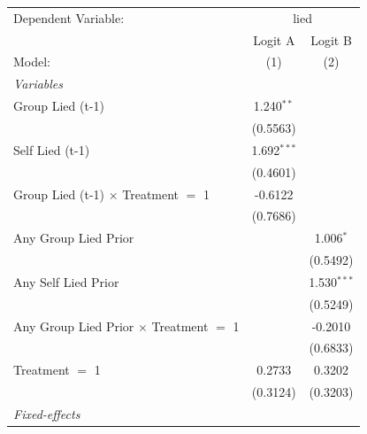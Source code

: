 
\begingroup
\centering
\begin{tabular}{lcc}
   \tabularnewline \midrule \midrule
   Dependent Variable: & \multicolumn{2}{c}{lied}\\
                                                                       & Logit A       & Logit B \\   
   Model:                                                              & (1)           & (2)\\  
   \midrule
   \emph{Variables}\\
   Group Lied (t-1)                                                    & 1.240$^{**}$  &   \\   
                                                                       & (0.5563)      &   \\   
   Self Lied (t-1)                                                     & 1.692$^{***}$ &   \\   
                                                                       & (0.4601)      &   \\   
   Group Lied (t-1) $\times$ Treatment $=$ 1                           & -0.6122       &   \\   
                                                                       & (0.7686)      &   \\   
   Any Group Lied Prior                                                &               & 1.006$^{*}$\\   
                                                                       &               & (0.5492)\\   
   Any Self Lied Prior                                                 &               & 1.530$^{***}$\\   
                                                                       &               & (0.5249)\\   
   Any Group Lied Prior $\times$ Treatment $=$ 1                       &               & -0.2010\\   
                                                                       &               & (0.6833)\\   
   Treatment $=$ 1                                                     & 0.2733        & 0.3202\\   
                                                                       & (0.3124)      & (0.3203)\\   
   \midrule
   \emph{Fixed-effects}\\

\end{tabular}
